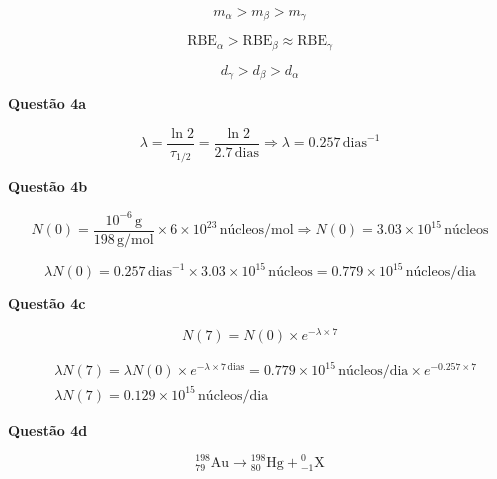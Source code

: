 \documentclass{article}
\begin{document}
\begin{equation}
\boxed{m_{\alpha} > m_{\beta} > m_{\gamma}}
\end{equation}

\begin{equation}
\boxed{\text{RBE}_{\alpha} > \text{RBE}_{\beta} \approx \text{RBE}_{\gamma}}
\end{equation}

\begin{equation}
\boxed{d_{\gamma} > d_{\beta} > d_{\alpha}}
\end{equation}

\textbf{Quest\~ao 4a}

\begin{equation}
\lambda = \frac{\ln 2}{\tau_{1/2}} = \frac{\ln 2}{2.7\,\text{dias}} \Rightarrow \boxed{\lambda = 0.257\,\text{dias}^{-1}}
\end{equation}

\textbf{Quest\~ao 4b}

\begin{equation}
N(0) = \frac{10^{-6}\,\text{g}}{198\,\text{g/mol}}\times 6\times 10^{23}\,\text{n\'ucleos/mol}\Rightarrow N(0) = 3.03\times 10^{15}\,\text{n\'ucleos}
\end{equation}

\begin{equation}
\boxed{\lambda N(0) = 0.257\,\text{dias}^{-1}\times 3.03 \times 10^{15}\,\text{n\'ucleos} = 0.779\times 10^{15}\,\text{n\'ucleos/dia}}
\end{equation}

\textbf{Quest\~ao 4c}

\begin{equation}
N(7) = N(0)\times e^{-\lambda\times 7}
\end{equation}

\begin{equation}
\begin{split}
&\lambda N(7) = \lambda N(0) \times e^{-\lambda\times 7\,\text{dias}} = 0.779\times 10^{15}\,\text{n\'ucleos/dia}\times e^{-0.257\times 7}\\
&\boxed{\lambda N(7) = 0.129\times 10^{15}\,\text{n\'ucleos/dia}}
\end{split}
\end{equation}

\textbf{Quest\~ao 4d}

\begin{equation}
{}^{198}_{79}\text{Au} \rightarrow {}^{198}_{80}\text{Hg} + {}^{0}_{-1}\text{X}
\end{equation}
\end{document}
